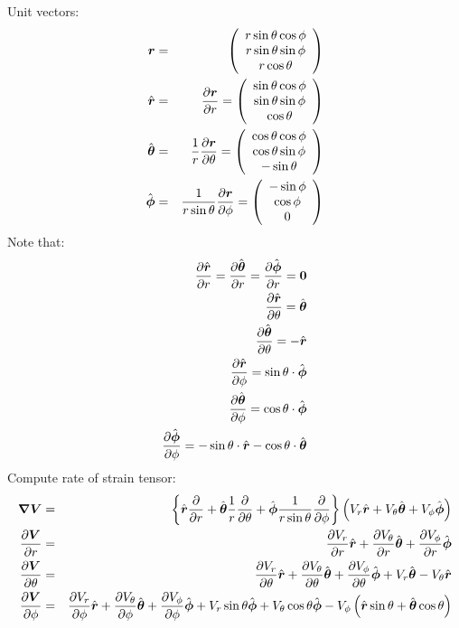 Unit vectors:
\begin{eqnarray}
 \br &=& \mat{c}{r\sin\theta \cos\phi \\ r\sin\theta \sin\phi \\ r\cos\theta} \\
 \brhat &=& \deriv{\br}{r}
 = \mat{c}{\sin\theta \cos\phi \\ \sin\theta \sin\phi \\ \cos\theta} \\
 \bthetahat &=& \frac{1}{r} \deriv{\br}{\theta}
 = \mat{c}{\cos\theta \cos\phi \\ \cos\theta \sin\phi \\ -\sin\theta} \\
 \bphihat &=& \frac{1}{r \sin \theta} \deriv{\br}{\phi}
 = \mat{c}{-\sin\phi \\ \cos\phi \\ 0}
\end{eqnarray}
Note that:
\begin{eqnarray}
  \deriv{\brhat}{r} = \deriv{\bthetahat}{r} = \deriv{\bphihat}{r} = \mathbf{0} \\
  \deriv{\brhat}{\theta} = \bthetahat \\
  \deriv{\bthetahat}{\theta} = -\brhat \\
  \deriv{\brhat}{\phi} = \sin \theta \cdot \bphihat \\
  \deriv{\bthetahat}{\phi} = \cos \theta \cdot \bphihat \\
  \deriv{\bphihat}{\phi} = -\sin \theta \cdot \brhat -\cos \theta \cdot \bthetahat
\end{eqnarray}
Compute rate of strain tensor:
\begin{eqnarray}
\bnabla\bV &=& \left\{ \brhat \deriv{}{r} +
\bthetahat \frac{1}{r} \deriv{}{\theta} +
\bphihat \frac{1}{r \sin\theta} \deriv{}{\phi} \right\}
\left( V_r \brhat + V_\theta \bthetahat + V_\phi \bphihat \right)
\\
\deriv{\bV}{r} &=&
\deriv{V_r}{r}\brhat + \deriv{V_\theta}{r}\bthetahat + \deriv{V_\phi}{r}\bphihat
\\
\deriv{\bV}{\theta} &=&
\deriv{V_r}{\theta}\brhat + \deriv{V_\theta}{\theta}\bthetahat + \deriv{V_\phi}{\theta}\bphihat
+ V_r\bthetahat - V_\theta\brhat
\\
\deriv{\bV}{\phi} &=&
\deriv{V_r}{\phi}\brhat + \deriv{V_\theta}{\phi}\bthetahat + \deriv{V_\phi}{\phi}\bphihat
+ V_r \sin\theta\bphihat + V_\theta \cos\theta\bphihat -
V_\phi \left(\brhat \sin\theta + \bthetahat \cos\theta \right)
\end{eqnarray}
